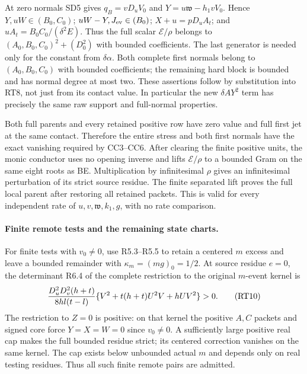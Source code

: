 At zero normals SD5 gives $q_B=vD_uV_0$ and
$Y=u\mathfrak w-h_1vV_0$. Hence $Y,uW\in(B_0,C_0)$;
$uW-Y,J_{\rm ev}\in(B_0)$; $X+u=pD_uA_t$; and
$uA_t=B_0C_0/(\delta^2E)$. Thus the full scalar
$\mathscr E/\rho$ belongs to
$(A_0,B_0,C_0)^2+(D_0^2)$ with bounded coefficients.
The last generator is needed only for the constant from $\delta\alpha$.
Both complete first normals belong to $(A_0,B_0,C_0)$ with bounded
coefficients; the remaining hard block is bounded and has normal
degree at most two. These assertions follow by substitution into RT8,
not just from its contact value. In particular the new $\delta A Y^2$
term has precisely the same raw support and full-normal properties.

Both full parents and every retained positive row have zero value and
full first jet at the same contact. Therefore the entire stress and
both first normals have the exact vanishing required by CC3--CC6.
After clearing the finite positive units, the monic conductor uses no
opening inverse and lifts $\mathscr E/\rho$ to a bounded Gram on the
same eight roots as BE. Multiplication by infinitesimal $\rho$ gives
an infinitesimal perturbation of its strict source residue. The finite
separated lift proves the full local parent after restoring all
retained packets. This is valid for every independent rate of
$u,v,\mathfrak w,k_1,g$, with no rate comparison.

\paragraph{Finite remote tests and the remaining state charts.}
For finite tests with $v_0\ne0$, use R5.3--R5.5 to retain a centered
$m$ excess and leave a bounded remainder with $\kappa_m=(mg)_0=1/2$.
At source residue $e=0$, the determinant R6.4 of the complete
restriction to the original $m$-event kernel is
\[
 {D_u^2D_v^2(h+t)\over8hl(t-l)}
 \{V^2+t(h+t)U^2V+hUV^2\}>0.                       \tag{RT10}
\]
The restriction to $Z=0$ is positive: on that kernel the positive
$A,C$ packets and signed core force $Y=X=W=0$ since $v_0\ne0$.
A sufficiently large positive real cap makes the full bounded residue
strict; its centered correction vanishes on the same kernel. The cap
exists below unbounded actual $m$ and depends only on real testing
residues. Thus all such finite remote pairs are admitted.

